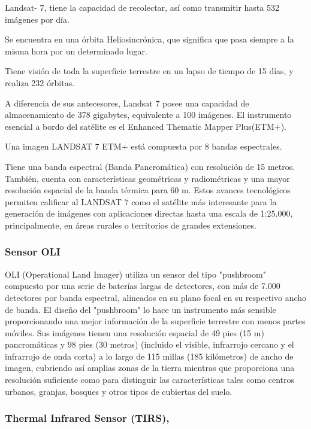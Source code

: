 Landsat- 7,  tiene la capacidad de recolectar, así como transmitir hasta 532 imágenes por día. 

Se encuentra en una órbita Heliosincrónica, que significa que pasa siempre a la misma hora por un determinado lugar. 

Tiene visión de toda la superficie terrestre en un lapso de tiempo de 15 días, y realiza 232 órbitas.

A diferencia de sus antecesores, Landsat 7 posee una capacidad de almacenamiento de 378 gigabytes, equivalente a 100 imágenes. El instrumento esencial a bordo del satélite es el Enhanced Thematic Mapper Plus(ETM+).

Una imagen LANDSAT 7 ETM+ está compuesta por 8 bandas espectrales.

Tiene una banda espectral (Banda Pancromática) con resolución de 15 metros. También, cuenta con características geométricas y radiométricas y una mayor resolución espacial de la banda térmica para 60 m. Estos avances tecnológicos permiten calificar al LANDSAT 7 como el satélite más interesante para la generación de imágenes con aplicaciones directas hasta una escala de 1:25.000, principalmente, en áreas rurales o territorios de grandes extensiones. 

\subsubsection{Sensor OLI}

OLI (Operational Land Imager) utiliza un sensor del tipo "pushbroom" compuesto por una serie de baterías largas de detectores, con más de 7.000 detectores por banda espectral, alineados en su plano focal en su respectivo ancho de banda. El diseño del "pushbroom" lo hace un instrumento más sensible proporcionando una mejor información de la superficie terrestre con menos partes móviles. Sus imágenes tienen una resolución espacial de 49 pies (15 m) pancromáticas y 98 pies (30 metros) (incluido el visible, infrarrojo cercano y el infrarrojo de onda corta) a lo largo de 115 millas (185 kilómetros) de ancho de imagen, cubriendo así amplias zonas de la tierra mientras que proporciona una resolución suficiente como para distinguir las características tales como centros urbanos, granjas, bosques y otros tipos de cubiertas del suelo. 

\subsubsection{Thermal Infrared Sensor (TIRS), }

